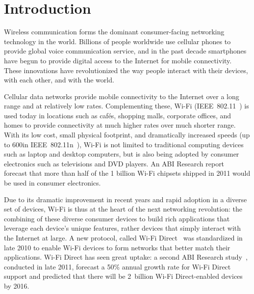 \ifx\mainfile\undefined

\setcounter{chapter}{0} %
\fi

\cleardoublepage
\chapter{Introduction}
\label{chap:intro}

Wireless communication forms the dominant consumer-facing networking technology in the world. Billions of people worldwide use cellular phones to provide global voice communication service, and in the past decade smartphones have begun to provide digital access to the Internet for mobile connectivity. These innovations have revolutionized the way people interact with their devices, with each other, and with the world.

Cellular data networks provide mobile connectivity to the Internet over a long range and at relatively low rates. Complementing these, Wi-Fi (IEEE~802.11~\cite{80211}) is used today in locations such as caf\'{e}s, shopping malls, corporate offices, and homes to provide connectivity at much higher rates over much shorter range. With its low cost, small physical footprint, and dramatically increased speeds (up to 600\Mbps in IEEE~802.11n~\cite{80211n}), Wi-Fi is not limited to traditional computing devices such as laptop and desktop computers, but is also being adopted by consumer electronics such as televisions and DVD players. An ABI Research report~\cite{ABI_Research_2010} forecast that more than half of the 1 billion Wi-Fi chipsets shipped in 2011 would be used in consumer electronics.

Due to its dramatic improvement in recent years and rapid adoption in a diverse set of devices, Wi-Fi is thus at the heart of the next networking revolution: the combining of these diverse consumer devices to build rich applications that leverage each device's unique features, rather devices that simply interact with the Internet at large. A new protocol, called Wi-Fi Direct~\cite{wifi_direct} was standardized in late 2010 to enable Wi-Fi devices to form networks that better match their applications. Wi-Fi Direct has seen great uptake: a second ABI Research study~\cite{ABI_Research_2011}, conducted in late 2011, forecast a 50\% annual growth rate for Wi-Fi Direct support and predicted that there will be 2~billion Wi-Fi Direct-enabled devices by 2016.

